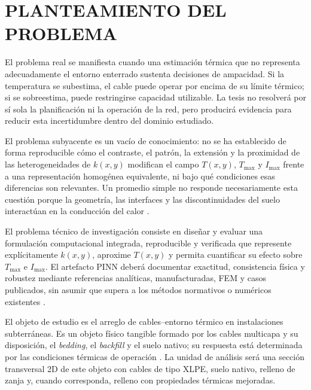 \documentclass[11pt,a4paper,oneside]{report}
\newcommand{\Tmax}{T_{\max}}
\newcommand{\Imax}{I_{\max}}
\newcommand{\kx}{k(x,y)}
\begin{document}

\section{PLANTEAMIENTO DEL PROBLEMA}
\label{sec:planteamiento-problema}

El problema real se manifiesta cuando una estimación térmica que no representa adecuadamente el entorno enterrado sustenta decisiones de ampacidad. Si la temperatura se subestima, el cable puede operar por encima de su límite térmico; si se sobreestima, puede restringirse capacidad utilizable. La tesis no resolverá por sí sola la planificación ni la operación de la red, pero producirá evidencia para reducir esta incertidumbre dentro del dominio estudiado.

El problema subyacente es un vacío de conocimiento: no se ha establecido de forma reproducible cómo el contraste, el patrón, la extensión y la proximidad de las heterogeneidades de $\kx$ modifican el campo $T(x,y)$, $\Tmax$ y $\Imax$ frente a una representación homogénea equivalente, ni bajo qué condiciones esas diferencias son relevantes. Un promedio simple no responde necesariamente esta cuestión porque la geometría, las interfaces y las discontinuidades del suelo interactúan en la conducción del calor \parencites[4--6]{enescu2021}[3--4,93--99]{cigre2025}.

El problema técnico de investigación consiste en diseñar y evaluar una formulación computacional integrada, reproducible y verificada que represente explícitamente $\kx$, aproxime $T(x,y)$ y permita cuantificar su efecto sobre $\Tmax$ e $\Imax$. El artefacto PINN deberá documentar exactitud, consistencia física y robustez mediante referencias analíticas, manufacturadas, FEM y casos publicados, sin asumir que supera a los métodos normativos o numéricos existentes \parencites{iec60287}{iec60853}[3--4,93--99]{cigre2025}[686--690]{raissi2019}.

El objeto de estudio es el arreglo de cables--entorno térmico en instalaciones subterráneas. Es un objeto físico tangible formado por los cables multicapa y su disposición, el \textit{bedding}, el \textit{backfill} y el suelo nativo; su respuesta está determinada por las condiciones térmicas de operación \parencites[3--6]{enescu2021}{ieee442}[1,10]{kim2025}. La unidad de análisis será una sección transversal 2D de este objeto con cables de tipo XLPE, suelo nativo, relleno de zanja y, cuando corresponda, relleno con propiedades térmicas mejoradas.
\end{document}
